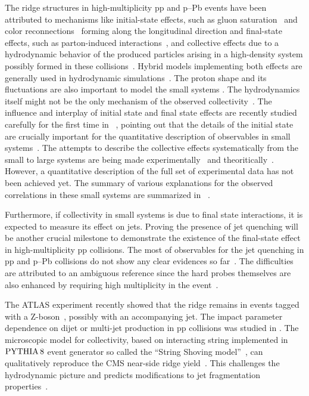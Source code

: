 The ridge structures in high-multiplicity pp and p--Pb events have been attributed to mechanisms like initial-state effects, such as gluon saturation~\cite{Dusling:2012cg,Bzdak:2013zma} and color reconnections~\cite{Ortiz:2013yxa,Sarma:2019teo} forming along the longitudinal direction and final-state effects, such as parton-induced interactions~\cite{Arbuzov:2011yr}, and collective effects due to a hydrodynamic behavior of the produced particles arising in a high-density system possibly formed in these collisions~\cite{Weller:2017tsr,Zhao:2017rgg}. 
Hybrid models implementing both effects are generally used in hydrodynamic simulations~\cite{Greif:2017bnr,Mantysaari:2017cni}. 
The proton shape and its fluctuations are also important to model the small systems \cite{Mantysaari:2017cni}.
The hydrodynamics itself might not be the only mechanism of the observed collectivity~\cite{Zhao:2020pty}. 
The influence and interplay of initial state and final state effects are recently studied carefully for the first time in ~\cite{Greif:2019ygb}, pointing out that the details of the initial state are crucially important for the quantitative description of observables in small systems~\cite{Schenke:2019pmk}. 
The attempts to describe the collective effects systematically from the small to large systems are being made experimentally~\cite{Acharya:2019vdf} and theoritically~\cite{Greif:2019ygb}.
However, a quantitative description of the full set of experimental data has not been achieved yet.
The summary of various explanations for the observed correlations in these small systems are summarized in ~\cite{Strickland:2018exs,Loizides:2016tew,Nagle:2018nvi}.

Furthermore, if collectivity in small systems is due to final state interactions, it is expected to measure its effect on jets. Proving the presence of jet quenching will be another crucial milestone to demonstrate the existence of the final-state effect in high-multiplicity pp collisions. The most of observables for the jet quenching in pp and p--Pb collisions do not show any clear evidences so far~\cite{Khachatryan:2016odn,Adam:2016jfp,Adam:2016dau,Acharya:2017okq}. The difficulties are attributed to an ambiguous reference since the hard probes themselves are also enhanced by requiring high multiplicity in the event~\cite{Adam:2016jfp,Acharya:2018egz}.

The ATLAS experiment recently showed that the ridge remains in events tagged with a Z-boson~\cite{Aaboud:2019mcw}, possibly with an accompanying jet.
The impact parameter dependence on dijet or multi-jet production in pp collisions was studied in \cite{Frankfurt:2003td}.
The microscopic model for collectivity, based on interacting string implemented in $\mathrm{PYTHIA}\,8$ event generator so called the ``String Shoving model''~\cite{Bierlich:2017vhg}, can qualitatively reproduce the CMS near-side ridge yield~\cite{Khachatryan:2016txc}. This challenges the hydrodynamic picture and predicts modifications to jet fragmentation
properties~\cite{Bierlich:2019ixq}.

